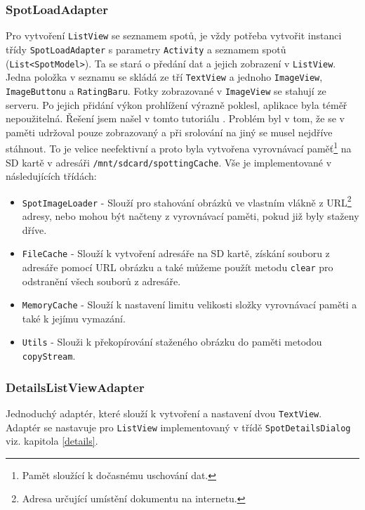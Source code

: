 \documentclass[12pt]{article}
\begin{document}
\subsubsection{SpotLoadAdapter}
\label{SpotLoadAdapter}
Pro vytvoření \verb+ListView+ se seznamem spotů, je vždy potřeba vytvořit instanci třídy \verb+SpotLoadAdapter+ s parametry \verb+Activity+ a seznamem spotů (\verb+List<SpotModel>+). Ta se stará o předání dat a jejich zobrazení v \verb+ListView+. Jedna položka v seznamu se skládá ze tří \verb+TextView+ a jednoho \verb+ImageView+, \verb+ImageButtonu+ a \verb+RatingBaru+. Fotky zobrazované v \verb+ImageView+ se stahují ze serveru. Po jejich přidání výkon prohlížení výrazně poklesl, aplikace byla téměř nepoužitelná. Řešení jsem našel v tomto tutoriálu \cite{cache}. Problém byl v tom, že se v paměti udržoval pouze zobrazovaný a při srolování na jiný se musel nejdříve stáhnout. To je velice neefektivní a proto byla vytvořena vyrovnávací paměť\footnote[13]{Pamět sloužící k dočasnému uschování dat.} na SD kartě v adresáři \verb+/mnt/sdcard/spottingCache+. Vše je implementované v následujících třídách:
\begin{itemize}
\item \verb+SpotImageLoader+ - Slouží pro stahování obrázků ve vlastním vlákně z URL\footnote[14]{Adresa určující umístění dokumentu na internetu.} adresy, nebo mohou být načteny z vyrovnávací paměti, pokud již byly staženy dříve.
\item \verb+FileCache+ - Slouží k vytvoření adresáře na SD kartě, získání souboru z adresáře pomocí URL obrázku a také můžeme použít metodu \verb+clear+ pro odstranění všech souborů z adresáře.
\item \verb+MemoryCache+ - Slouží k nastavení limitu velikosti složky vyrovnávací paměti a také k jejímu vymazání.
\item \verb+Utils+ - Slouži k překopírování staženého obrázku do paměti metodou \verb+copyStream+.
\end{itemize}
\subsubsection{DetailsListViewAdapter}
Jednoduchý adaptér, které slouží k vytvoření a nastavení dvou \verb+TextView+. Adaptér se nastavuje pro \verb+ListView+ implementovaný v třídě \verb+SpotDetailsDialog+ viz. kapitola \ref{details}.
\end{document}
